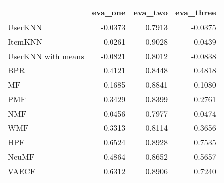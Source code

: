 \begin{tabular}{lrrr}
\toprule
{} &  eva\_one &  eva\_two &  eva\_three \\
\midrule
UserKNN            &  -0.0373 &   0.7913 &    -0.0375 \\
ItemKNN            &  -0.0261 &   0.9028 &    -0.0439 \\
UserKNN with means &  -0.0821 &   0.8012 &    -0.0838 \\
BPR                &   0.4121 &   0.8448 &     0.4818 \\
MF                 &   0.1685 &   0.8841 &     0.1080 \\
PMF                &   0.3429 &   0.8399 &     0.2761 \\
NMF                &  -0.0456 &   0.7977 &    -0.0474 \\
WMF                &   0.3313 &   0.8114 &     0.3656 \\
HPF                &   0.6524 &   0.8928 &     0.7535 \\
NeuMF              &   0.4864 &   0.8652 &     0.5657 \\
VAECF              &   0.6312 &   0.8906 &     0.7240 \\
\bottomrule
\end{tabular}
